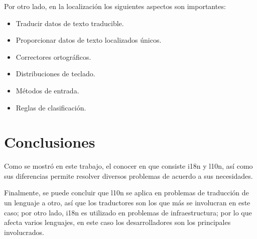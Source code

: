 \documentclass[a4paper,12pt]{article}
\begin{document}
Por otro lado, en la localización los siguientes aspectos son importantes:

\begin{itemize}
 \item Traducir datos de texto traducible.
 \item Proporcionar datos de texto localizados únicos.
 \item Correctores ortográficos.
 \item Distribuciones de teclado.
 \item Métodos de entrada.
 \item Reglas de clasificación.
\end{itemize}

\section{Conclusiones}
Como se mostró en este trabajo, el conocer en que consiste i18n y l10n, así 
como sus diferencias permite resolver diversos problemas de acuerdo a sus 
necesidades.

Finalmente, se puede concluir que l10n se aplica en problemas de traducción de 
un lenguaje a otro, así que los traductores son los que más se involucran en 
este caso; por otro lado, i18n es utilizado en problemas de infraestructura; 
por lo que afecta varios lenguajes, en este caso los desarrolladores son los 
principales involucrados.
\end{document}
